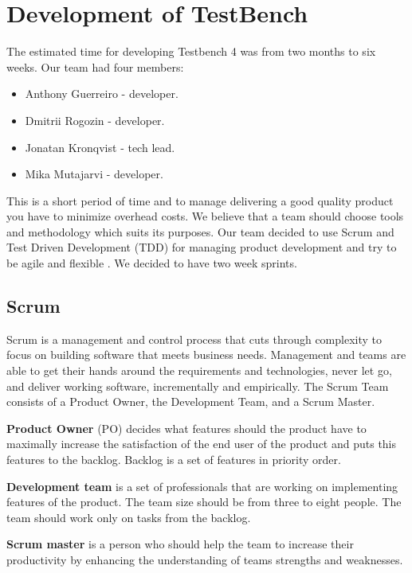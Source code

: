 \chapter{Development of TestBench}
\label{ch:testbenchdevelop}
  
  The estimated time for developing Testbench 4 was from two months to six
  weeks.
  Our team had four members:
  \begin{itemize}
    \item Anthony Guerreiro - developer.
    \item Dmitrii Rogozin - developer.
    \item Jonatan Kronqvist - tech lead.
    \item Mika Mutajarvi - developer.
    
  \end{itemize}
  
   This is a short period of time and to manage delivering a good quality
   product you have to minimize overhead costs. We believe that a team should choose tools
    and methodology which suits its purposes. 
    Our team decided to use Scrum and Test Driven Development (TDD) for managing
    product development and try to be agile and flexible \cite{scrumSite}. 
    We decided to have two week sprints.

  \section{Scrum}
    Scrum is a management and control process that cuts through
    complexity to focus on building software that meets business needs. Management and teams are able to get their
    hands around the requirements and technologies, never let go, and deliver working software,
    incrementally and empirically. The Scrum Team consists of a Product Owner,
    the Development Team, and a Scrum Master.
    
  \textbf{Product Owner} (PO) decides what features should the product have to
  maximally increase the satisfaction of the end user of the product and puts this features to the backlog.
  Backlog is a set of features in priority order.
  
  \textbf{Development team} is
  a set of professionals that are working on implementing features of the product. 
  The team size should be from three to eight people. The team should work only on tasks from the backlog.
  
  \textbf{Scrum master} is a person who should help the team to increase their
  productivity by enhancing the understanding of teams strengths and weaknesses.

